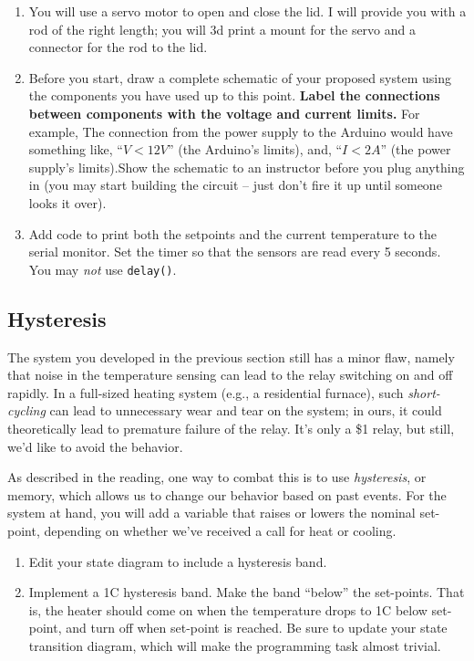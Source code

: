 \documentclass[11pt]{article} %
\begin{document}
\begin{enumerate}
\item You will use a servo motor to open and close the lid. I will provide you with a rod of the right length; you will 3d print a mount for the servo and a connector for the rod to the lid.
\item Before you start, draw a complete schematic of your proposed system using the components you have used up to this point. {\bf Label the connections between components with the voltage and current limits.} For example, The connection from the power supply to the Arduino would have something like, ``$V<12V$'' (the Arduino's limits), and, ``$I < 2A$'' (the power supply's limits).Show the schematic to an instructor before you plug anything in (you may start building the circuit -- just don’t fire it up until someone looks it over).
\item Add code to print both the setpoints and the current temperature to the serial monitor. Set the timer so that the sensors are read every 5 seconds. You may \emph{not} use \verb|delay()|.
\end{enumerate}

\subsection*{Hysteresis}

The system you developed in the previous section still has a minor flaw, namely that noise in the temperature sensing can lead to the relay switching on and off rapidly. In a full-sized heating system (e.g., a residential furnace), such \emph{short-cycling} can lead to unnecessary wear and tear on the system; in ours, it could theoretically lead to premature failure of the relay. It's only a \$1 relay, but still, we'd like to avoid the behavior.

As described in the reading, one way to combat this is to use \emph{hysteresis}, or memory, which allows us to change our behavior based on past events. For the system at hand, you will add a variable that raises or lowers the nominal set-point, depending on whether we've received a call for heat or cooling. 

\begin{enumerate}
\item Edit your state diagram to include a hysteresis band.
\item Implement a 1C hysteresis band. Make the band ``below'' the set-points. That is, the heater should come on when the temperature drops to 1C below set-point, and turn off when set-point is reached. Be sure to update your state transition diagram, which will make the programming task almost trivial.
\end{enumerate}
\end{document}
